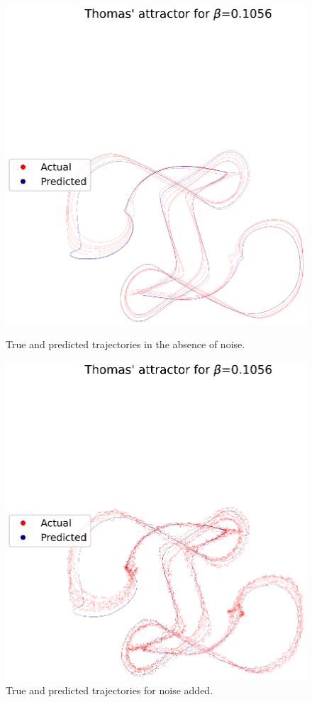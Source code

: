 \documentclass[a4paper,12pt,twoside]{report}
\begin{document}
\begin{figure}[ht]
  \centering
    \centering
    \includegraphics[width=\linewidth]{Thomas_nonoise.eps}
    \caption*{True and predicted trajectories in the absence of noise.}
  \endminipage\hfill
    \centering
    \includegraphics[width=\linewidth]{ThomasNoisy.eps}
    \caption*{True and predicted trajectories for noise added.}
  \endminipage
\end{figure}
\end{document}
